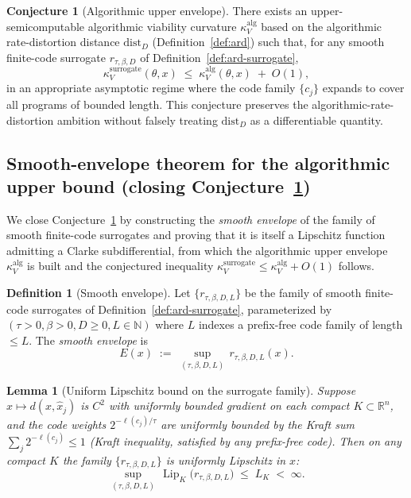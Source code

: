 \documentclass[11pt,a4paper]{article}
\theoremstyle{plain}
\newtheorem{lemma}[theorem]{Lemma}
\theoremstyle{definition}
\newtheorem{definition}[theorem]{Definition}
\newtheorem{conjecture}[theorem]{Conjecture}
\theoremstyle{remark}
\newcommand{\kk}{\kappa_{\!V}}
\newcommand{\RR}{\mathbb{R}}
\newcommand{\distD}{\mathrm{dist}_{D}}
\DeclareMathOperator{\Lip}{Lip}
\begin{document}
\begin{conjecture}[Algorithmic upper envelope]
\label{conj:alg-envelope}
There exists an upper-semicomputable algorithmic viability curvature
$\kk^{\mathrm{alg}}$ based on the algorithmic rate-distortion distance
$\distD$ (Definition~\ref{def:ard}) such that, for any smooth
finite-code surrogate $r_{\tau, \beta, D}$ of
Definition~\ref{def:ard-surrogate},
\[
  \kk^{\mathrm{surrogate}}(\theta, x)
  \;\leq\;
  \kk^{\mathrm{alg}}(\theta, x) \;+\; O(1),
\]
in an appropriate asymptotic regime where the code family
$\{c_j\}$ expands to cover all programs of bounded length. This
conjecture preserves the algorithmic-rate-distortion ambition without
falsely treating $\distD$ as a differentiable quantity.
\end{conjecture}

\subsection{Smooth-envelope theorem for the algorithmic upper bound
(closing Conjecture~\ref{conj:alg-envelope})}
\label{sec:smooth-envelope}

We close Conjecture~\ref{conj:alg-envelope} by constructing the
\emph{smooth envelope} of the family of smooth finite-code surrogates
and proving that it is itself a Lipschitz function admitting a Clarke
subdifferential, from which the algorithmic upper envelope
$\kk^{\mathrm{alg}}$ is built and the conjectured inequality
$\kk^{\mathrm{surrogate}} \leq \kk^{\mathrm{alg}} + O(1)$ follows.

\begin{definition}[Smooth envelope]
\label{def:smooth-envelope}
Let $\{r_{\tau,\beta,D,L}\}$ be the family of smooth finite-code surrogates
of Definition~\ref{def:ard-surrogate}, parameterized by $(\tau > 0, \beta > 0,
D \geq 0, L \in \mathbb{N})$ where $L$ indexes a prefix-free code family of length
$\leq L$. The \emph{smooth envelope} is
\begin{equation}\label{eq:smooth-envelope}
  E(x) \;:=\; \sup_{(\tau, \beta, D, L)}\, r_{\tau, \beta, D, L}(x).
\end{equation}
\end{definition}

\begin{lemma}[Uniform Lipschitz bound on the surrogate family]
\label{lem:uniform-lip}
Suppose $x \mapsto d(x, \hat x_j)$ is $C^2$ with uniformly bounded
gradient on each compact $K \subset \RR^n$, and the code weights
$2^{-\ell(c_j)/\tau}$ are uniformly bounded by the Kraft sum $\sum_j
2^{-\ell(c_j)} \leq 1$ (Kraft inequality, satisfied by any prefix-free
code). Then on any compact $K$ the family $\{r_{\tau,\beta,D,L}\}$ is
uniformly Lipschitz in $x$:
\[
  \sup_{(\tau,\beta,D,L)}\, \Lip_K\!\bigl(r_{\tau,\beta,D,L}\bigr) \;\leq\; L_K \;<\; \infty.
\]
\end{lemma}
\end{document}

